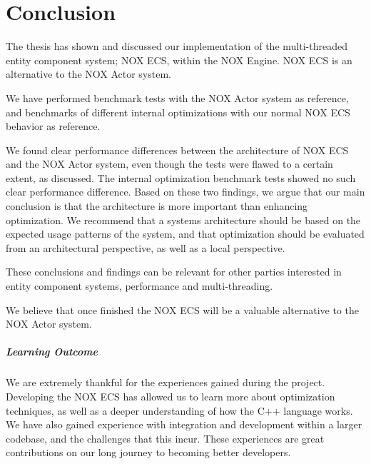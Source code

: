 \chapter{Conclusion}
\label{chap:conclusion}
The thesis has shown and discussed our implementation of the multi-threaded entity
component system; NOX ECS, within the NOX Engine. NOX ECS is an alternative to the NOX Actor system.

We have performed benchmark tests with the NOX Actor system as reference,
and benchmarks of different internal optimizations with our normal NOX ECS behavior as reference.

We found clear performance differences between the architecture of NOX ECS and the NOX Actor system,
even though the tests were flawed to a certain extent, as discussed.
The internal optimization benchmark tests showed no such clear performance difference.
Based on these two findings, we argue that our main conclusion is that the architecture is more important than enhancing optimization.
We recommend that a systems architecture should be based on the expected usage patterns of the system,
and that optimization should be evaluated from an architectural perspective, as well as a local perspective.

These conclusions and findings can be relevant for other parties interested
in entity component systems, performance and multi-threading.

We believe that once finished the NOX ECS will be a valuable alternative to the NOX Actor system.

\paragraph{Learning Outcome}
We are extremely thankful for the experiences gained during the project.
Developing the NOX ECS has allowed us to learn more about optimization techniques,
as well as a deeper understanding of how the C++ language works.
We have also gained experience with integration and development within a larger codebase,
and the challenges that this incur.
These experiences are great contributions on our long journey to becoming better developers.
